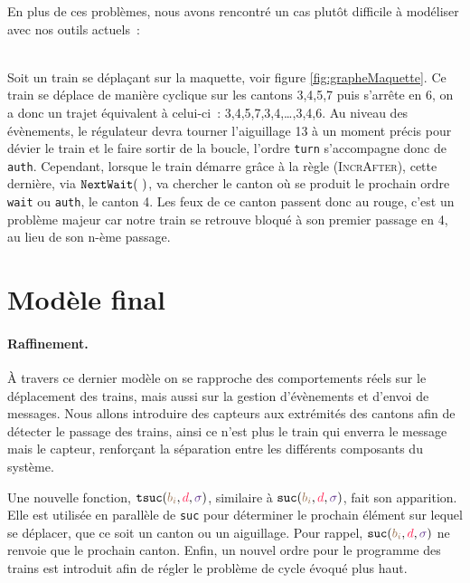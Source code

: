 \documentclass[oneside, a4paper, 11pt]{book}
\newcommand{\ruleFmt}[1]{\textsc{(#1)}}
\newcommand{\ruleDef}[1]{\hypertarget{#1}{\ruleFmt{#1}}}
\newcommand{\sucblock}{{\mathtt{suc}}}
\newcommand{\tsucblock}{{\mathtt{tsuc}}}
\newcommand{\dirFmt}[1]{{\color{dircolor} #1}}
\newcommand{\posFmt}[1]{{\color{poscolor}{#1}}}
\newcommand{\suc}[3]{\ensuremath{\sucblock(\posFmt{#1}, \dirFmt{#2}, \swFmt{#3})}}
\newcommand{\tsuc}[3]{\ensuremath{\tsucblock(\posFmt{#1}, \dirFmt{#2}, \swFmt{#3})}}
\newcommand{\swFmt}[1]{{\color{swcolor}{#1}}}
\newcommand{\nextWait}[1]{\ensuremath{{\tt NextWait}(#1)}}
\begin{document}
En plus de ces problèmes, nous avons rencontré un cas plutôt difficile à modéliser avec nos outils actuels~:
\begin{example}[Cycle]
	~\\

	Soit un train se déplaçant sur la maquette, voir figure \ref{fig:grapheMaquette}. Ce train se déplace de manière cyclique sur les cantons 3,4,5,7 puis s'arrête en 6, on a donc un trajet équivalent à celui-ci~: 3,4,5,7,3,4,\dots,3,4,6.
	Au niveau des évènements, le régulateur devra tourner l'aiguillage 13 à un moment précis pour dévier le train et le faire sortir de la boucle, l'ordre \texttt{turn} s'accompagne donc de \texttt{auth}.
	Cependant, lorsque le train démarre grâce à la règle \ruleDef{IncrAfter}, cette dernière, via \nextWait{~}, va chercher le canton où se produit le prochain ordre \texttt{wait} ou \texttt{auth}, le canton 4. Les feux de ce canton passent donc au rouge, c'est un problème majeur car notre train se retrouve bloqué à son premier passage en 4, au lieu de son n-ème passage.
\end{example}











\section{Modèle final}

\paragraph{Raffinement.} À travers ce dernier modèle on se rapproche des comportements réels sur le déplacement des trains, mais aussi sur la gestion d'évènements et d'envoi de messages.
Nous allons introduire des capteurs aux extrémités des cantons afin de détecter le passage des trains, ainsi ce n'est plus le train qui enverra le message mais le capteur, renforçant la séparation entre les différents composants du système.

Une nouvelle fonction, \tsuc{b_i}{d}{\swFmt{\sigma}}, similaire à \suc{b_i}{d}{\sigma}, fait son apparition. Elle est utilisée en parallèle de \texttt{suc} pour déterminer le prochain élément sur lequel se déplacer, que ce soit un canton ou un aiguillage. Pour rappel, \suc{b_i}{d}{\sigma} ne renvoie que le prochain canton.
Enfin, un nouvel ordre pour le programme des trains est introduit afin de régler le problème de cycle évoqué plus haut.
\end{document}

